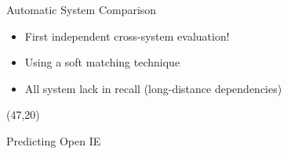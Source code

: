 \documentclass[final]{beamer}
\newcommand{\commonvspace}[0]{\vspace{1cm}}
\begin{document}
\begin{frame}{}
\begin{textblock}{39}
\commonvspace

\begin{block}{Automatic System Comparison}

  
  
  \begin{itemize}
    \setlength\itemsep{1em}
  \item \alert{First independent cross-system evaluation!}
      \item Using a soft matching technique
  \item All system lack in recall (long-distance dependencies)
  \end{itemize}
\end{block}

\end{textblock}



\begin{textblock}{39}(47,20)
\begin{block}{Predicting Open IE}

\end{block}

\end{textblock}

\end{frame}
\end{document}
